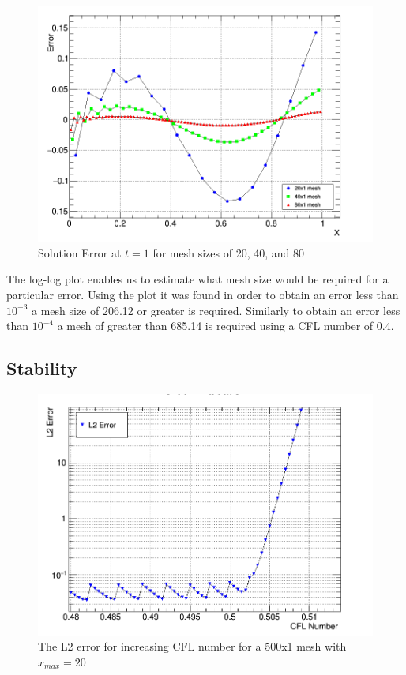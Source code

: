\documentclass[paper=a4, fontsize=11pt, abstract=on]{scrartcl}
\numberwithin{equation}{section}		%
\numberwithin{figure}{section}			%
\numberwithin{table}{section}				%
\begin{document}
\begin{figure}[H]
\centering
\includegraphics[width=0.85\linewidth]{qq22}
\caption{Solution Error at $t=1$ for mesh sizes of 20, 40, and 80}
\label{3D}
\end{figure}


The log-log plot enables us to estimate what mesh size would be required for a particular error. Using the plot it was found in order to obtain an error less than $10^{-3}$ a mesh size of 206.12 or greater is required. Similarly to obtain an error less than $10^{-4}$ a mesh of greater than 685.14 is required using a CFL number of 0.4.

\subsection{Stability}

\begin{figure}[H]
\centering
\includegraphics[width=0.85\linewidth]{stabl2}
\caption{The L2 error for increasing CFL number for a 500x1 mesh with $x_{max} = 20$}
\label{q4}
\end{figure}
\end{document}
